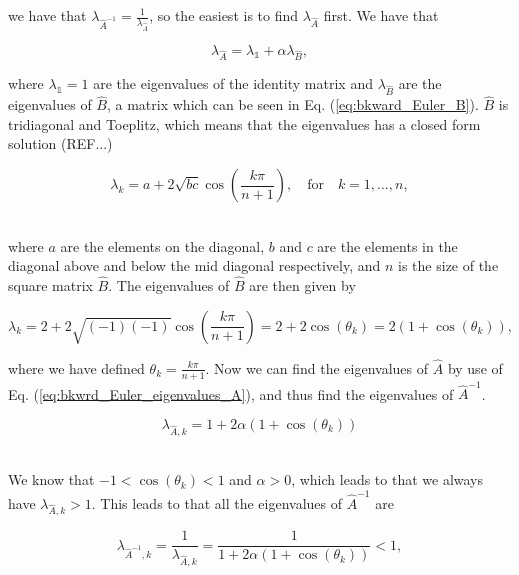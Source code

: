 \documentclass[12pt]{article}
\begin{document}
\begin{flushleft}
we have that $\lambda_{\hat{A}^{-1}} = \frac{1}{\lambda_{\hat{A}}}$, so the easiest is to find $\lambda_{\hat{A}}$ first. We have that

\vspace{5mm}
\begin{equation}\label{eq:bkwrd_Euler_eigenvalues_A}
\lambda_{\hat{A}} = \lambda_{\mathbb{1}} + \alpha\lambda_{\hat{B}},
\end{equation}
\vspace{5mm}

where $\lambda_{\mathbb{1}} = 1$ are the eigenvalues of the identity matrix and $\lambda_{\hat{B}}$ are the eigenvalues of $\hat{B}$, a matrix which can be seen in Eq. (\ref{eq:bkward_Euler_B}). $\hat{B}$ is tridiagonal and Toeplitz, which means that the eigenvalues has a closed form solution (REF...)

\vspace{5mm}
$$\lambda_k = a + 2\sqrt{bc}\cos\left(\frac{k\pi}{n+1}\right),\quad \text{for}\quad k=1,\dots ,n,$$\\
\vspace{5mm}  

where $a$ are the elements on the diagonal, $b$ and $c$ are the elements in the diagonal above and below the mid diagonal respectively, and $n$ is the size of the square matrix $\hat{B}$. The eigenvalues of $\hat{B}$ are then given by

\vspace{5mm}
\begin{equation}\label{eq:eigenvalues_toeplitz}
\lambda_k = 2 +2\sqrt{(-1)(-1)}\cos\left(\frac{k\pi}{n+1}\right) = 2+2\cos(\theta_k) = 2(1+\cos(\theta_k)),
\end{equation}
\vspace{5mm}

where we have defined $\theta_k = \frac{k\pi}{n+1}$. Now we can find the eigenvalues of $\hat{A}$ by use of Eq. (\ref{eq:bkwrd_Euler_eigenvalues_A}), and thus find the eigenvalues of $\hat{A}^{-1}$.

\vspace{5mm}
$$\lambda_{\hat{A},k} = 1+2\alpha(1+\cos(\theta_k))$$\\
\vspace{5mm}

We know that $-1 < \cos(\theta_k) < 1$ and
$\alpha > 0$, which leads to that we always have $\lambda_{\hat{A},k}>1$. This leads to that all the eigenvalues of $\hat{A}^{-1}$ are

\vspace{5mm}
$$\lambda_{\hat{A}^{-1},k} = \frac{1}{\lambda_{\hat{A},k}} = \frac{1}{1+2\alpha(1+\cos(\theta_k))}< 1,$$\\
\vspace{5mm}


\end{flushleft}
\end{document}
